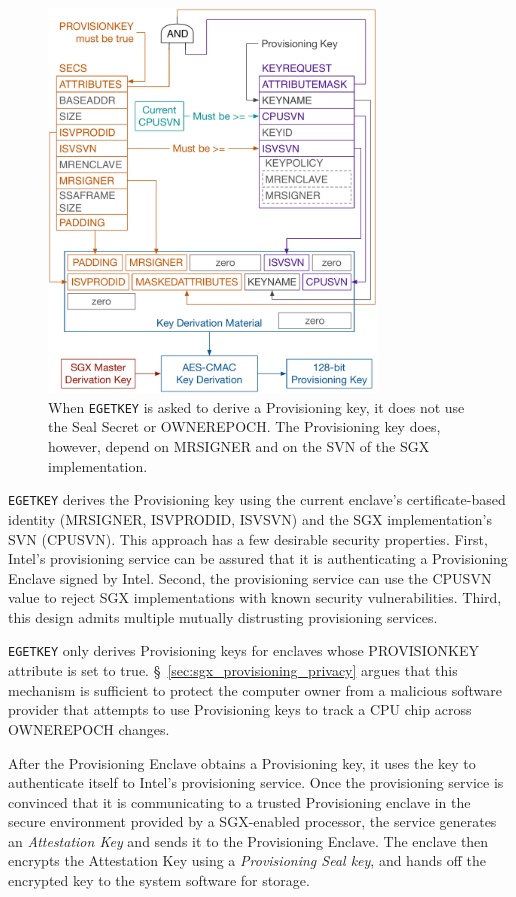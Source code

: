 \begin{figure}[hbt]
  \centering
  \includegraphics[width=87mm]{figures/sgx_egetkey_provision.pdf}
  \caption{
    When \texttt{EGETKEY} is asked to derive a Provisioning key, it does not
    use the Seal Secret or OWNEREPOCH. The Provisioning key does, however,
    depend on MRSIGNER and on the SVN of the SGX implementation.
  }
  \label{fig:sgx_egetkey_provision}
\end{figure}

\texttt{EGETKEY} derives the Provisioning key using the current enclave's
certificate-based identity (MRSIGNER, ISVPRODID, ISVSVN) and the SGX
implementation's SVN (CPUSVN). This approach has a few desirable security
properties. First, Intel's provisioning service can be assured that it is
authenticating a Provisioning Enclave signed by Intel. Second, the provisioning
service can use the CPUSVN value to reject SGX implementations with known
security vulnerabilities. Third, this design admits multiple mutually
distrusting provisioning services.

\texttt{EGETKEY} only derives Provisioning keys for enclaves whose PROVISIONKEY
attribute is set to true. \S~\ref{sec:sgx_provisioning_privacy} argues that
this mechanism is sufficient to protect the computer owner from a malicious
software provider that attempts to use Provisioning keys to track a CPU chip
across OWNEREPOCH changes.

After the Provisioning Enclave obtains a Provisioning key, it uses the key to
authenticate itself to Intel's provisioning service. Once the provisioning
service is convinced that it is communicating to a trusted Provisioning enclave
in the secure environment provided by a SGX-enabled processor, the service
generates an \textit{Attestation Key} and sends it to the Provisioning Enclave.
The enclave then encrypts the Attestation Key using a
\textit{Provisioning Seal key}, and hands off the encrypted key to the system
software for storage.

